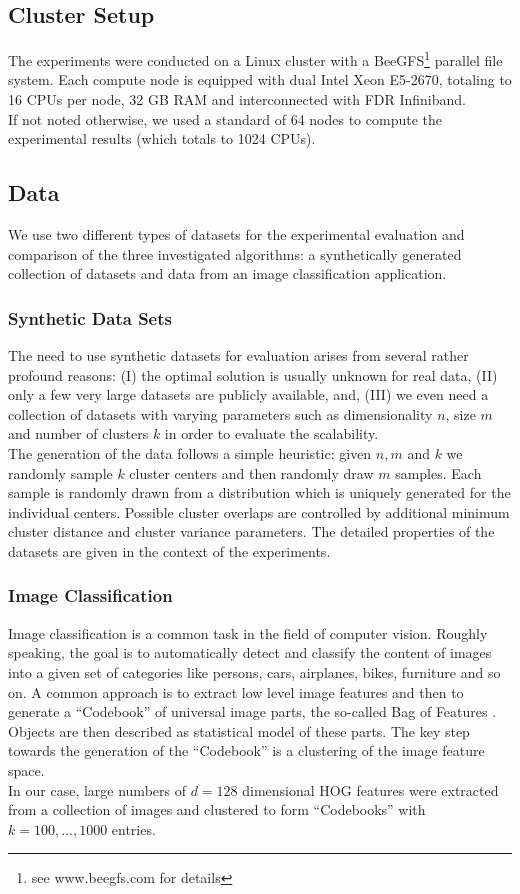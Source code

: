 \documentclass{acm_proc_article-sp}
\begin{document}
\subsection{Cluster Setup}
The experiments were conducted on a Linux cluster with a BeeGFS\footnote{see www.beegfs.com for details}
parallel file system.  
Each compute node is equipped
 with dual Intel Xeon E5-2670, totaling to 16 CPUs per node, 32 GB RAM and 
interconnected with FDR Infiniband.\\
If not noted otherwise, we used a standard of 64 nodes to compute the 
experimental results (which totals to 1024 CPUs). 

\subsection{Data\label{sec_data}}
We use two different types of datasets for the experimental evaluation
and comparison of the three investigated algorithms: a synthetically generated
collection of datasets and data from an image classification application.
\subsubsection*{Synthetic Data Sets}
The need to use synthetic datasets for evaluation arises from several rather 
profound reasons: (I) the optimal solution is usually unknown for real data,
(II) only a few very large datasets are publicly available, and, (III) we even 
need a collection of datasets with varying parameters such as dimensionality $n$,
size $m$ and number of clusters $k$ in order to evaluate the scalability.\\
The generation of the data follows a simple heuristic: given $n,m$ and $k$ we
randomly sample $k$ cluster centers and then randomly draw $m$ samples. Each
sample is randomly drawn from a distribution which is uniquely generated for 
the individual centers. Possible cluster overlaps are controlled by additional
minimum cluster distance and cluster variance parameters. The detailed properties 
of the datasets are given in the context of the experiments.     
\subsubsection*{Image Classification}  
Image classification is a common task in the field of computer vision. Roughly
speaking, the goal is to automatically detect and classify the content of
images into a given set of categories like persons, cars, airplanes, bikes,
furniture and so on. A common approach is to extract low level image features 
and then to generate a ``Codebook'' of universal image parts, the so-called 
Bag of Features \cite{nowak2006sampling}. Objects are then described 
as statistical model of these parts. The key step towards the generation of
the ``Codebook'' is a clustering of the image feature space.\\
In our case, large numbers of $d=128$ dimensional HOG features 
\cite{zhu2006fast} were extracted from a collection of images and clustered 
to form ``Codebooks'' with $k=100,\dots,1000$ entries.   
 
\end{document}
